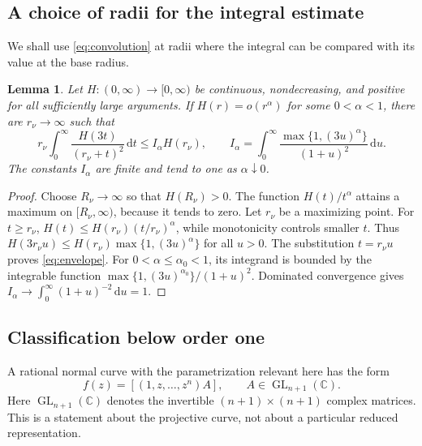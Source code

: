 \documentclass[11pt,letterpaper,reqno]{amsart}
\newtheorem{lem}[thm]{Lemma}
\theoremstyle{remark}
\numberwithin{equation}{section}
\newcommand{\C}{\mathbb C}
\begin{document}
\subsection{A choice of radii for the integral estimate}

We shall use \eqref{eq:convolution} at radii where the integral can be
compared with its value at the base radius.

\begin{lem}\label{lem:envelope}
Let $H\colon(0,\infty)\to[0,\infty)$ be continuous, nondecreasing,
and positive for all sufficiently large arguments.
If $H(r)=o(r^\alpha)$ for some $0<\alpha<1$, there are $r_\nu\to\infty$
such that
\begin{equation}\label{eq:envelope}
 r_\nu\int_0^\infty\frac{H(3t)}{(r_\nu+t)^2}\,\mathrm dt
 \le I_\alpha H(r_\nu),\qquad
 I_\alpha=\int_0^\infty\frac{\max\{1,(3u)^\alpha\}}{(1+u)^2}\,\mathrm du.
\end{equation}
The constants $I_\alpha$ are finite and tend to one as $\alpha\downarrow0$.
\end{lem}
\begin{proof}
Choose $R_\nu\to\infty$ so that $H(R_\nu)>0$. The function
$H(t)/t^\alpha$ attains a maximum on $[R_\nu,\infty)$, because it tends to
zero. Let $r_\nu$ be a maximizing point. For $t\ge r_\nu$,
$H(t)\le H(r_\nu)(t/r_\nu)^\alpha$, while monotonicity controls smaller
$t$. Thus
$H(3r_\nu u)\le H(r_\nu)\max\{1,(3u)^\alpha\}$ for all $u>0$.
The substitution $t=r_\nu u$ proves \eqref{eq:envelope}.
For $0<\alpha\le\alpha_0<1$, its integrand is bounded by the integrable
function $\max\{1,(3u)^{\alpha_0}\}/(1+u)^2$. Dominated convergence gives
$I_\alpha\to\int_0^\infty(1+u)^{-2}\,\mathrm du=1$.
\end{proof}

\subsection{Classification below order one}

A rational normal curve with the parametrization relevant here has the form
\begin{equation}\label{eq:rationalnormal}
 f(z)=[(1,z,\ldots,z^{n})A],\qquad A\in\operatorname{GL}_{n+1}(\C).
\end{equation}
Here $\operatorname{GL}_{n+1}(\C)$ denotes the invertible $(n+1)\times(n+1)$ complex
matrices. This is a statement about the projective curve, not about a particular
reduced representation.
\end{document}
